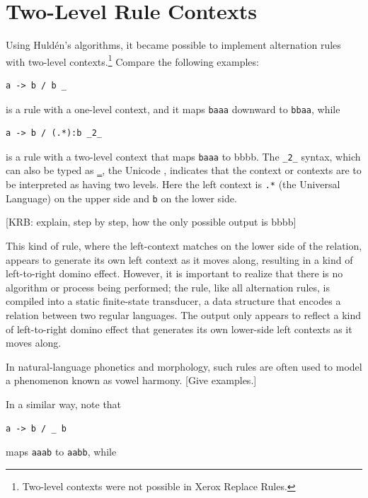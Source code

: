 \section{Two-Level Rule Contexts}

Using Huld\'en's algorithms, it became possible to implement alternation rules with two-level contexts.\footnote{Two-level contexts
were not possible in Xerox Replace Rules.}
Compare the following examples:

\begin{Verbatim}
a -> b / b _
\end{Verbatim}

\noindent
is a rule with a one-level context, and it maps \texttt{baaa} downward to \texttt{bbaa}, while

\begin{Verbatim}
a -> b / (.*):b _2_
\end{Verbatim}

\noindent
is a rule with a two-level context that maps \texttt{baaa} to {bbbb}.  The
\verb!_2_! syntax, which can also be typed as ‗, the Unicode
,  indicates that the context or contexts are to be interpreted as
having two levels.  Here the left context is \verb!.*! (the Universal Language) on the upper side and \verb!b! on the
lower side.

[KRB:  explain, step by step, how the only possible output is bbbb]

This kind of rule, where the left-context matches on
the lower side of the relation, appears to generate its own left context as it moves
along, resulting in a kind of left-to-right domino effect.  However, it is
important to realize that there is no algorithm or process being performed; the rule,
like all alternation rules, is compiled into a static finite-state transducer, a data
structure that encodes a
relation between two regular languages.  The output only appears to reflect a kind of
left-to-right domino effect that generates its own lower-side left contexts as it
moves along.

In natural-language phonetics and morphology, such rules are often used to model a phenomenon known
as vowel harmony.  [Give examples.]

In a similar way, note that

\begin{Verbatim}
a -> b / _ b
\end{Verbatim}

\noindent
maps \texttt{aaab} to \texttt{aabb}, while

